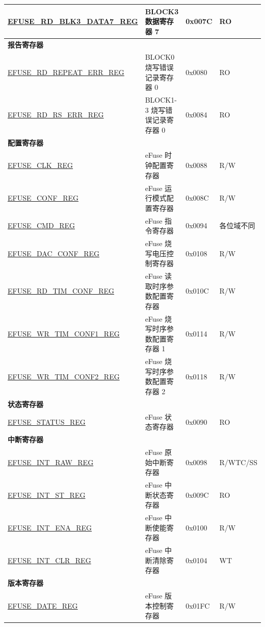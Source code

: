 \begin{longtable}{ | p{6cm} | p{7.2cm} | p{1.3cm} | p{1.5cm} | }
\hyperref[regdesc:EFUSERDBLK3DATA7REG]{EFUSE\_RD\_BLK3\_DATA7\_REG} & BLOCK3 数据寄存器 7 & 0x007C & RO \\ \hline
\multicolumn{4}{|l|}{\textbf{报告寄存器}} \\ \hline
\hyperref[regdesc:EFUSERDREPEATERRREG]{EFUSE\_RD\_REPEAT\_ERR\_REG} &  BLOCK0 烧写错误记录寄存器 0 & 0x0080 & RO \\ \hline
\hyperref[regdesc:EFUSERDRSERRREG]{EFUSE\_RD\_RS\_ERR\_REG} & BLOCK1-3 烧写错误记录寄存器 0 & 0x0084 & RO \\ \hline
\multicolumn{4}{|l|}{\textbf{配置寄存器}} \\ \hline
\hyperref[regdesc:EFUSECLKREG]{EFUSE\_CLK\_REG} & eFuse 时钟配置寄存器 & 0x0088 & R/W \\ \hline
\hyperref[regdesc:EFUSECONFREG]{EFUSE\_CONF\_REG} & eFuse 运行模式配置寄存器 & 0x008C & R/W \\ \hline
\hyperref[regdesc:EFUSECMDREG]{EFUSE\_CMD\_REG} & eFuse 指令寄存器 & 0x0094 & 各位域不同 \\ \hline
\hyperref[regdesc:EFUSEDACCONFREG]{EFUSE\_DAC\_CONF\_REG} & eFuse 烧写电压控制寄存器 & 0x0108 & R/W \\ \hline
\hyperref[regdesc:EFUSERDTIMCONFREG]{EFUSE\_RD\_TIM\_CONF\_REG} & eFuse 读取时序参数配置寄存器 & 0x010C & R/W \\ \hline
\hyperref[regdesc:EFUSEWRTIMCONF1REG]{EFUSE\_WR\_TIM\_CONF1\_REG} & eFuse 烧写时序参数配置寄存器 1 & 0x0114 & R/W \\ \hline
\hyperref[regdesc:EFUSEWRTIMCONF2REG]{EFUSE\_WR\_TIM\_CONF2\_REG} & eFuse 烧写时序参数配置寄存器 2 & 0x0118 & R/W \\ \hline
\multicolumn{4}{|l|}{\textbf{状态寄存器}} \\ \hline
\hyperref[regdesc:EFUSESTATUSREG]{EFUSE\_STATUS\_REG} & eFuse 状态寄存器 & 0x0090 & RO \\ \hline
\multicolumn{4}{|l|}{\textbf{中断寄存器}} \\ \hline
\hyperref[regdesc:EFUSEINTRAWREG]{EFUSE\_INT\_RAW\_REG} & eFuse 原始中断寄存器 & 0x0098 & R/WTC/SS \\ \hline
\hyperref[regdesc:EFUSEINTSTREG]{EFUSE\_INT\_ST\_REG} & eFuse 中断状态寄存器 & 0x009C & RO \\ \hline
\hyperref[regdesc:EFUSEINTENAREG]{EFUSE\_INT\_ENA\_REG} & eFuse 中断使能寄存器 & 0x0100 & R/W \\ \hline
\hyperref[regdesc:EFUSEINTCLRREG]{EFUSE\_INT\_CLR\_REG} & eFuse 中断清除寄存器 & 0x0104 & WT \\ \hline
\multicolumn{4}{|l|}{\textbf{版本寄存器}} \\ \hline
\hyperref[regdesc:EFUSEDATEREG]{EFUSE\_DATE\_REG} & eFuse 版本控制寄存器 & 0x01FC & R/W \\ \hline
\end{longtable}
